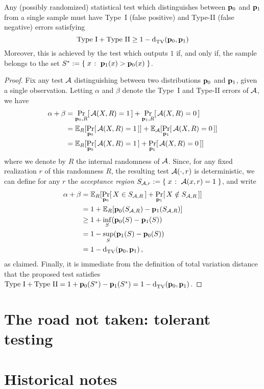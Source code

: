 \begin{lemma}
  Any (possibly randomized) statistical test which distinguishes between $\mathbf{p}_0$ and $\mathbf{p}_1$ from a single sample must have Type~I (false positive) and Type-II (false negative) errors satisfying
  \[
      \text{Type~I} + \text{Type~II} \geq 1- \totalvardist{\p_0}{\p_1}
  \]
  Moreover, this is achieved by the test which outputs $1$ if, and only if, the sample belongs to the set $S^\ast \eqdef \setOfSuchThat{x}{\p_1(x) > \p_0(x)}$.
\end{lemma}
\begin{proof}
Fix any test $\mathcal{A}$ distinguishing between two distributions $\mathbf{p}_0$ and $\mathbf{p}_1$, given a single observation. Letting $\alpha$ and $\beta$ denote the Type~I and Type-II errors of $\mathcal{A}$, we have
\begin{align*}
  \alpha+\beta 
  &= \probaDistrOf{\p_0,R}{\Algo(X,R)=1} + \probaDistrOf{\p_1,R}{\Algo(X,R)=0} \\
  &= \shortexpect_{R}[ \probaDistrOf{\p_0}{\Algo(X,R)=1} ] + \shortexpect_{\Algo}[ \probaDistrOf{\p_1}{\Algo(X,R)=0} ] \\
  &= \shortexpect_{R}[ \probaDistrOf{\p_0}{\Algo(X,R)=1} + \probaDistrOf{\p_1}{\Algo(X,R)=0} ]
\end{align*}
where we denote by $R$ the internal randomness of $\mathcal{A}$. Since, for any fixed realization $r$ of this randomness $R$, the resulting test $\mathcal{A}(\cdot,r)$ is deterministic, we can define for any $r$ the \emph{acceptance region} $S_{\Algo,r} \eqdef \setOfSuchThat{x}{\Algo(x,r)=1}$, and write
\begin{align*}
  \alpha+\beta 
  &= \shortexpect_{R}[ \probaDistrOf{\p_0}{X \in S_{\Algo,R}} + \probaDistrOf{\p_1}{X \notin S_{\Algo,R}} ] \\
  &= 1+\shortexpect_{R}[ \p_0(S_{\Algo,R}) - \p_1(S_{\Algo,R}) ] \\
  &\geq 1 + \inf_{S}(\p_0(S) - \p_1(S)) \\
  &= 1 - \sup_{S}(\p_1(S) - \p_0(S)) \\
  &= 1- \totalvardist{\p_0}{\p_1}\,,
\end{align*}
as claimed. Finally, it is immediate from the definition of total variation distance that the proposed test satisfies $\text{Type~I} + \text{Type~II} = 1 + \p_0(S^\ast) - \p_1(S^\ast) = 1- \totalvardist{\p_0}{\p_1}$.
\end{proof}

\section{The road not taken: tolerant testing}

\section{Historical notes}
